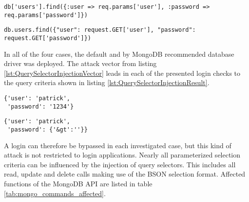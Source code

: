 \begin{lstlisting}[caption={Vulnerable Ruby example for query selector injection on MongoDB}, label={lst:RubyQuerySelectorInjection}]
db['users'].find({:user => req.params['user'], :password => req.params['password']})
\end{lstlisting}

\begin{lstlisting}[caption={Vulnerable Python example for query selector injection on MongoDB}, label={lst:PythonQuerySelectorInjection}]
db.users.find({"user": request.GET['user'], "password": request.GET['password']})
\end{lstlisting}

In all of the four cases, the default and by MongoDB recommended database driver was deployed. The attack vector from listing \ref{lst:QuerySelectorInjectionVector} leads in each of the presented login checks to the query criteria shown in listing \ref{lst:QuerySelectorInjectionResult}. \\
\begin{minipage}{.97\textwidth}
\begin{minipage}[t]{.49\textwidth}
\begin{lstlisting}[caption={Resulting query of normal request}, label={lst:QuerySelectorNormalResult}]
{'user': 'patrick', 
 'password': '1234'}
\end{lstlisting}
\end{minipage}
\hfill
\begin{minipage}[t]{.49\textwidth}
\begin{lstlisting}[caption={Resulting query of query selector injection}, label={lst:QuerySelectorInjectionResult}]
{'user': 'patrick',
 'password': {'&gt':''}}
\end{lstlisting}
\end{minipage}
\end{minipage}


A login can therefore be bypassed in each investigated case, but this kind of attack is not restricted to login applications. Nearly all parameterized selection criteria can be influenced by the injection of query selectors. This includes all read, update and delete calls making use of the BSON selection format. Affected functions of the MongoDB API are listed in table \ref{tab:mongo_commands_affected}.\\


